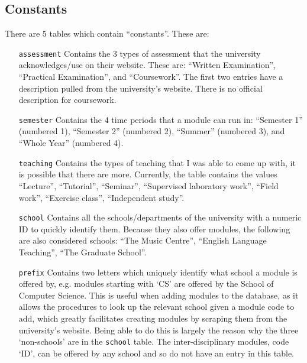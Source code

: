     \subsection{Constants}
    There are 5 tables which contain ``constants''. These are:
    \begin{itemize}
        \item[\texttt{assessment}] Contains the 3 types of assessment that the
              university acknowledges/use on their website. These are: ``Written
              Examination'', ``Practical Examination'', and ``Coursework''. The
              first two entries have a description pulled from the university's
              website. There is no official description for coursework.
        \item[\texttt{semester}] Contains the 4 time periods that a module can
              run in: ``Semester 1'' (numbered 1), ``Semester 2'' (numbered 2),
              ``Summer'' (numbered 3), and ``Whole Year'' (numbered 4).
        \item[\texttt{teaching}] Contains the types of teaching that I was
              able to come up with, it is possible that there are more.
              Currently, the table contains the values ``Lecture'',
              ``Tutorial'', ``Seminar'', ``Supervised laboratory work'',
              ``Field work'', ``Exercise class'', ``Independent study''.
        \item[\texttt{school}] Contains all the schools/departments of the
              university with a numeric ID to quickly identify them. Because
              they also offer modules, the following are also considered
              schools: ``The Music Centre'', ``English Language Teaching'',
              ``The Graduate School''.
        \item[\texttt{prefix}] Contains two letters which uniquely identify what
              school a module is offered by, e.g. modules starting with `CS' are
              offered by the School of Computer Science. This is useful when
              adding modules to the database, as it allows the procedures to
              look up the relevant school given a module code to add, which
              greatly facilitates creating modules by scraping them from the
              university's website. Being able to do this is largely the reason
              why the three `non-schools' are in the \texttt{school} table. The
              inter-disciplinary modules, code `ID', can be offered by any
              school and so do not have an entry in this table.
    \end{itemize}

